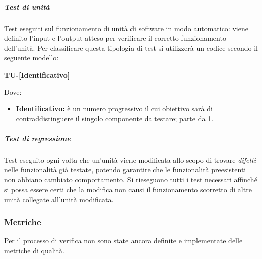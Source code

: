                     \subparagraph*{Test di unità}
                            Test eseguiti sul funzionamento di unità di software in modo automatico: viene definito l'input e l'output atteso per verificare il corretto funzionamento dell'unità.
                            Per classificare questa tipologia di test si utilizzerà un codice secondo il seguente modello:     

                            \begin{center}
                            	\textbf{TU-[Identificativo]}
                            \end{center}
                            Dove:
                            
							\begin{itemize}
                            	\item \textbf{Identificativo:} è un numero progressivo il cui obiettivo sarà di contraddistinguere il singolo componente da testare; parte da 1.
							\end{itemize}
						
                    \subparagraph*{Test di regressione}
        				Test eseguito ogni volta che un'unità viene modificata allo scopo di trovare \textit{difetti} nelle funzionalità già testate, potendo garantire che le funzionalità preesistenti non abbiano cambiato comportamento. Si rieseguono tutti i test necessari affinché si possa essere certi che la modifica non causi il funzionamento scorretto di altre unità collegate all'unità modificata.


                \subsubsection{Metriche}

                Per il processo di verifica non sono state ancora definite e implementate delle metriche di qualità.




